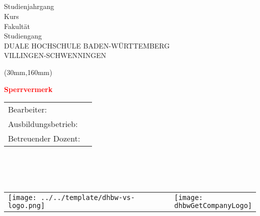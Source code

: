 
\begin{center}
\vspace*{1cm} \ \\
{\fontsize{40}{48}\selectfont \bfseries \dhbwGetTitle \\}
\vspace{0.75cm}
{\Large\bfseries \dhbwGetSubtitle \\}
\vspace{1.5cm}
\dhbwGetTextType \\
Studienjahrgang \dhbwGetAcademicYear \\
Kurs \dhbwGetCourse \\
\vspace{1.5cm}
Fakultät \dhbwGetFaculty \\
Studiengang \dhbwGetFieldOfStudy \\
DUALE HOCHSCHULE BADEN-WÜRTTEMBERG\\
VILLINGEN-SCHWENNINGEN\\
\end{center}
\begin{textblock*}{50mm}(30mm,160mm)
    \begin{rotate}{50}
        \fontsize{34}{40}\bfseries\textcolor{red}{Sperrvermerk}
    \end{rotate}
\end{textblock*}
\begin{table}[b]
\begin{tabular}{ll}
Bearbeiter: 		&	\dhbwGetAuthor \\
Ausbildungsbetrieb:	&	\dhbwGetCompanyName \\
Betreuender Dozent:	&	\dhbwGetLecturer \\
\end{tabular}\\
\\
\\
\begin{tabularx}{\textwidth}{lXl}
\texttt{[image: ../../template/dhbw-vs-logo.png]} &
&
\raisebox{\height}{\texttt{[image: \\dhbwGetCompanyLogo]} }
\end{tabularx}
\end{table}

\restoregeometry
